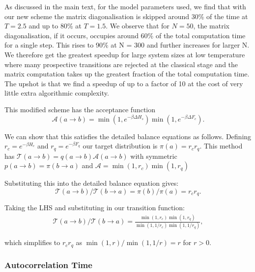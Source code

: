 As discussed in the main text, for the model parameters used, we find that with our new scheme the matrix diagonalisation is skipped around 30\% of the time at \(T = 2.5\) and up to 80\% at \(T = 1.5\). We observe that for \(N = 50\), the matrix diagonalisation, if it occurs, occupies around 60\% of the total computation time for a single step. This rises to 90\% at N = 300 and further increases for larger N. We therefore get the greatest speedup for large system sizes at low temperature where many prospective transitions are rejected at the classical stage and the matrix computation takes up the greatest fraction of the total computation time. The upshot is that we find a speedup of up to a factor of 10 at the cost of very little extra algorithmic complexity.

This modified scheme has the acceptance function \[\mathcal{A}(a \to b) = \min\left(1, e^{-\beta \Delta H_s}\right)\min\left(1, e^{-\beta \Delta F_c}\right).\]

We can show that this satisfies the detailed balance equations as follows. Defining \(r_c = e^{-\beta H_c}\) and \(r_q = e^{-\beta F_q}\) our target distribution is \(\pi(a) = r_c r_q\). This method has \(\mathcal{T}(a\to b) = q(a\to b)\mathcal{A}(a \to b)\) with symmetric \(p(a \to b) = \pi(b \to a)\) and \(\mathcal{A} = \min\left(1, r_c\right) \min\left(1, r_q\right)\)

Substituting this into the detailed balance equation gives: \[\mathcal{T}(a \to b)/\mathcal{T}(b \to a) = \pi(b)/\pi(a) = r_c r_q.\]

Taking the LHS and substituting in our transition function: \[\begin{aligned}
\mathcal{T}(a \to b)/\mathcal{T}(b \to a) = \frac{\min\left(1, r_c\right) \min\left(1, r_q\right)}{ \min\left(1, 1/r_c\right) \min\left(1, 1/r_q\right)},\end{aligned}\]

which simplifies to \(r_c r_q\) as \(\min(1,r)/\min(1,1/r) = r\) for \(r > 0\).

\hypertarget{app-mcmc-autocorrelation}{%
\subsubsection{Autocorrelation Time}\label{app-mcmc-autocorrelation}}


